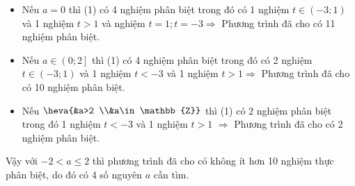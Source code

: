 \begin{ex}
{\begin{itemize}
			\item Nếu $a=0$ thì (1) có 4 nghiệm phân biệt trong đó có 1 nghiệm $t\in \left( -3;1 \right)$ và 1 nghiệm $t>1$ và nghiệm $t=1; t=-3\Rightarrow $ Phương trình đã cho có 11 nghiệm phân biệt.
			\item Nếu $a\in \left( 0;2 \right]$ thì (1) có 4 nghiệm phân biệt trong đó có 2 nghiệm $t\in \left( -3;1 \right)$ và 1 nghiệm $t<-3$ và 1 nghiệm $t>1\Rightarrow $ Phương trình đã cho có 10 nghiệm phân biệt.
			\item Nếu $\heva{&a>2 \\&a\in \mathbb{Z}}$ thì (1) có 2 nghiệm phân biệt trong đó 1 nghiệm $t<-3$ và 1 nghiệm $t>1$ $\Rightarrow $ Phương trình đã cho có 2 nghiệm phân biệt.
		\end{itemize}
		Vậy với $-2<a\le 2$ thì phương trình đã cho có không ít hơn 10 nghiệm thực phân biệt, do đó có 4 số nguyên $a$ cần tìm.
	}
\end{ex}
